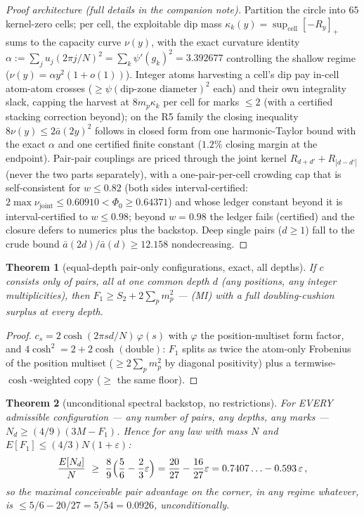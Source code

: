 \documentclass[11pt]{article}
\theoremstyle{plain}
\newtheorem{theorem}{Theorem}[section]
\theoremstyle{definition}
\theoremstyle{remark}
\newcommand{\Nd}{N_{d}}
\begin{document}
\begin{proof}[Proof architecture (full details in the companion note)]
\renewcommand{\qedsymbol}{QED (architecture)}
Partition the circle into $65$ kernel-zero cells; per cell, the exploitable dip
mass $\kappa_k(y) = \sup_{\mathrm{cell}} [-R_y]_+$ sums to the capacity curve
$\nu(y)$, with the exact curvature identity
$\alpha := \sum_j u_j (2\pi j/N)^2 = \sum_k \psi'(g_k)^2 = 3.392677$ controlling
the shallow regime ($\nu(y) = \alpha y^2 (1 + o(1))$). Integer atoms harvesting a
cell's dip pay in-cell atom-atom crosses ($\ge \psi(\text{dip-zone diameter})^2$
each) and their own integrality slack, capping the harvest at
$8 m_p \kappa_k$ per cell for marks $\le 2$ (with a certified stacking correction
beyond); on the R5 family the closing inequality
$8\nu(y) \le 2\bar{a}(2y)^2$ follows in closed form from one harmonic-Taylor
bound with the exact $\alpha$ and one certified finite constant ($1.2\%$ closing
margin at the endpoint). Pair-pair couplings are priced through the joint kernel
$R_{d+d'} + R_{|d-d'|}$ (never the two parts separately), with a
one-pair-per-cell crowding cap that is self-consistent for $w \le 0.82$ (both
sides interval-certified: $2 \max \nu_{\mathrm{joint}} \le 0.60910 < \Phi_0 \ge
0.64371$) and whose ledger constant beyond it is interval-certified to
$w \le 0.98$; beyond $w = 0.98$ the ledger fails (certified) and the closure
defers to numerics plus the backstop. Deep single pairs ($d \ge 1$) fall to the
crude bound $\bar{a}(2d)/\bar{a}(d) \ge 12.158$ nondecreasing.
\end{proof}

\begin{theorem}[equal-depth pair-only configurations, exact, all depths]
\label{thm:equaldepth}
If $c$ consists only of pairs, all at one common depth $d$ (any positions, any
integer multiplicities), then $F_1 \ge S_2 + 2 \sum_p m_p^2$ --- (MI) with a full
doubling-cushion surplus at every depth.
\end{theorem}

\begin{proof}
$c_s = 2\cosh(2\pi s d/N)\,\varphi(s)$ with $\varphi$ the position-multiset form
factor, and $4\cosh^2 = 2 + 2\cosh(\text{double})$: $F_1$ splits as twice the
atom-only Frobenius of the position multiset ($\ge 2\sum_p m_p^2$ by diagonal
positivity) plus a termwise-$\cosh$-weighted copy ($\ge$ the same floor).
\end{proof}

\begin{theorem}[unconditional spectral backstop, no restrictions]
\label{thm:backstop}
For EVERY admissible configuration --- any number of pairs, any depths, any
marks --- $\Nd \ge (4/9)(3M - F_1)$. Hence for any law with mass $N$ and
$E[F_1] \le (4/3)N(1 + \varepsilon)$:
\[
  \frac{E[\Nd]}{N} \ \ge\ \frac{8}{9}\Bigl( \frac{5}{6}
    - \frac{2}{3}\varepsilon \Bigr)
  = \frac{20}{27} - \frac{16}{27}\varepsilon
  = 0.7407\ldots - 0.593\,\varepsilon \,,
\]
so the maximal conceivable pair advantage on the corner, in any regime whatever,
is $\le 5/6 - 20/27 = 5/54 = 0.0926$, unconditionally.
\end{theorem}
\end{document}
